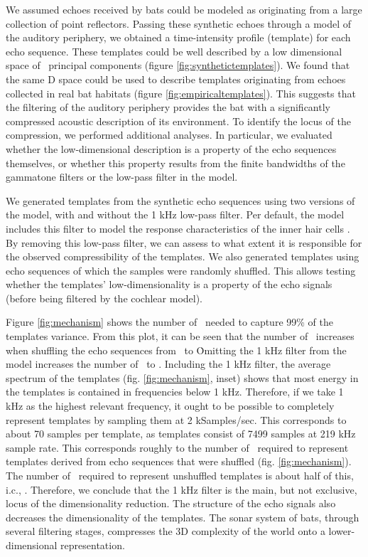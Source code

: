 \documentclass[preprint,5p]{elsarticle}
\begin{document}
We assumed echoes received by bats could be modeled as originating from a large collection of point reflectors. Passing these synthetic echoes through a model of the auditory periphery, we obtained a time-intensity profile (template) for each echo sequence. These templates could be well described by a low dimensional space of \pca\ principal components (figure \ref{fig:synthetictemplates}). We found that the same \pca D space could be used to describe templates originating from echoes collected in real bat habitats (figure \ref{fig:empiricaltemplates}). This suggests that the filtering of the auditory periphery provides the bat with a significantly compressed acoustic description of its environment. To identify the locus of the compression, we performed additional analyses. In particular, we evaluated whether the low-dimensional description is a property of the echo sequences themselves, or whether this property results from the finite bandwidths of the gammatone filters or the low-pass filter in the \citet{Wiegrebe2008} model.

We generated templates from the synthetic echo sequences using two versions of the \citet{Wiegrebe2008} model, with and without the 1 kHz low-pass filter. Per default, the model includes this filter to model the response characteristics of the inner hair cells \citep{Meddis2006,Reijniers2010a}. By removing this low-pass filter, we can assess to what extent it is responsible for the observed compressibility of the templates. We also generated templates using echo sequences of which the samples were randomly shuffled. This allows testing whether the templates' low-dimensionality is a property of the echo signals (before being filtered by the cochlear model). 

Figure \ref{fig:mechanism} shows the number of \pcs\ needed to capture 99\% of the templates variance. From this plot, it can be seen that the number of \pcs\ increases when shuffling the echo sequences from \pca\ to \FigVIIInumberIII\. Omitting the 1 kHz filter from the  \citet{Wiegrebe2008} model increases the number of \pcs\ to \FigVIIInumberII. Including the 1 kHz filter, the average spectrum of the templates (fig. \ref{fig:mechanism}, inset) shows that most energy in the templates is contained in frequencies below 1 kHz. Therefore, if we take 1 kHz as the highest relevant frequency, it ought to be possible to completely represent templates by sampling them at 2 kSamples/sec. This corresponds to about 70 samples per template, as templates consist of 7499 samples at 219 kHz sample rate. This corresponds roughly to the number of \pcs\ required to represent templates derived from echo sequences that were shuffled  (fig. \ref{fig:mechanism}). The number of \pcs\ required to represent unshuffled templates is about half of this, i.c., \pca. Therefore, we conclude that the 1 kHz filter is the main, but not exclusive, locus of the dimensionality reduction. The structure of the echo signals also decreases the dimensionality of the templates. The sonar system of bats, through several filtering stages, compresses the 3D complexity of the world onto a lower-dimensional representation.
\end{document}
